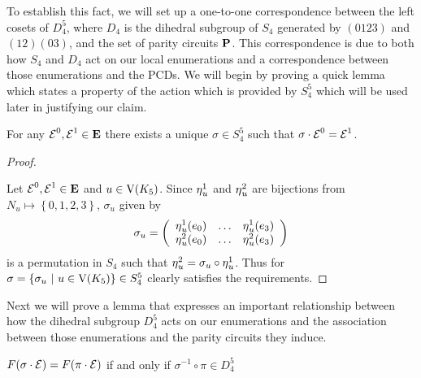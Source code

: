 \noindent
To establish this fact, we will set up a one-to-one correspondence between the left cosets of  $D_{4}^5$, where $D_4$ is the dihedral subgroup of $S_4$ generated by $\left( 0 1 2 3 \right)$ and $\left( 1 2 \right) \left(0 3 \right)$, and the set of parity circuits $\operatorname{\mathbf{P}}$. This correspondence is due to both how $S_4$ and $D_4$ act on our local enumerations and a correspondence between those enumerations and the PCDs. We will begin by proving a quick lemma which states a property of the action which is provided by $S_{4}^5$ which will be used later in justifying our claim.      

\begin{lemma}
  \label{lem:unique_associates}
For any  $\operatorname{\mathcal{E}}^{0},\operatorname{\mathcal{E}}^{1} \in \operatorname{\mathbf{E}}$ there exists a unique $\sigma \in S_{4}^5$ such that $\sigma \cdot \operatorname{\mathcal{E}}^{0} = \operatorname{\mathcal{E}}^{1}$. 
\end{lemma}

\begin{proof}
  \label{pf:unique_associates}

Let $\operatorname{\mathcal{E}}^0,\operatorname{\mathcal{E}}^1 \in \operatorname{\mathbf{E}}$ and $u \in \mathrm{V}(K_5)$. Since $\operatorname{\eta}_{u}^{1}$ and $\operatorname{\eta}_{u}^{2}$ are bijections from $N_{u} \mapsto \left\{ 0, 1, 2, 3 \right\}$, $\sigma_{u}$ given by
\[
 \sigma_{u} = \left(
   \begin{array}[h]{ccc}
      \enum_{u}^{1}(e_0) &\ldots & \enum_{u}^{1} (e_3) \\
      \enum_{u}^{2}(e_0) & \ldots & \enum_{u}^{2}(e_3)  
   \end{array}
\right)
\] is a permutation in $S_4$ such that $\operatorname{\eta}_{u}^{2} = \sigma_{u} \circ \operatorname{\eta}_{u}^{1}$. Thus for $\sigma = \left\{ \sigma_{u}\ \vert \ u \in \mathrm{V}(K_5) \right\} \in S_{4}^{5}$ clearly satisfies the requirements. 
\end{proof}

\noindent
Next we will prove a lemma that expresses an important relationship between how the dihedral subgroup $D_{4}^5$ acts on our enumerations and the association between those enumerations and the parity circuits they induce. 
\newpage
\begin{lemma}
\label{lem:coset_lemma}
$F(\sigma \cdot \operatorname{\mathcal{E}}) = F(\pi \cdot \operatorname{\mathcal{E}})$ if and only if $\sigma^{-1} \circ \pi \in D_{4}^{5}$
\end{lemma}


